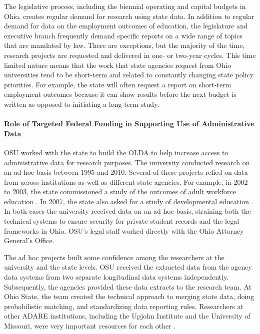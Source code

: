 \documentclass[
]{WileySix}
\begin{document}
The legislative process, including the biennial operating and capital budgets in Ohio, creates regular demand for research using state data. In addition to regular demand for data on the employment outcomes of education, the legislature and executive branch frequently demand specific reports on a wide range of topics that are mandated by law. There are exceptions, but the majority of the time, research projects are requested and delivered in one- or two-year cycles. This time limited nature means that the work that state agencies request from Ohio universities tend to be short-term and related to constantly changing state policy priorities. For example, the state will often request a report on short-term employment outcomes because it can show results before the next budget is written as opposed to initiating a long-term study.

\hypertarget{role-of-targeted-federal-funding-in-supporting-use-of-administrative-data}{%
\paragraph{Role of Targeted Federal Funding in Supporting Use of Administrative Data}\label{role-of-targeted-federal-funding-in-supporting-use-of-administrative-data}}

OSU worked with the state to build the OLDA to help increase access to administrative data for research purposes. The university conducted research on an ad hoc basis between 1995 and 2010. Several of these projects relied on data from across institutions as well as different state agencies. For example, in 2002 to 2003, the state commissioned a study of the outcomes of adult workforce education \citep{hawley2003, hawley2003a, hawley2005}. In 2007, the state also asked for a study of developmental education \citep{hawley2013, hawley2017}. In both cases the university received data on an ad hoc basis, straining both the technical systems to ensure security for private student records and the legal frameworks in Ohio. OSU's legal staff worked directly with the Ohio Attorney General's Office.

The ad hoc projects built some confidence among the researchers at the university and the state levels. OSU received the extracted data from the agency data systems from two separate longitudinal data systems independently. Subsequently, the agencies provided these data extracts to the research team. At Ohio State, the team created the technical approach to merging state data, doing probabilistic matching, and standardizing data reporting rules. Researchers at other ADARE institutions, including the Upjohn Institute and the University of Missouri, were very important resources for each other \citep{stevens2012}.
\end{document}
